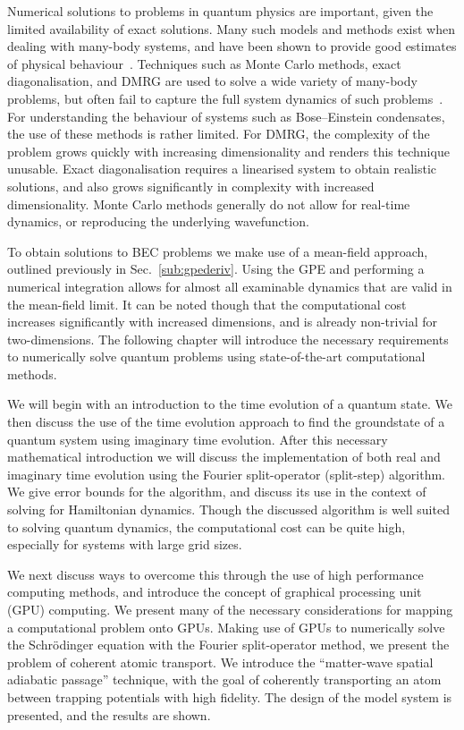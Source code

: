 Numerical solutions to problems in quantum physics are important, given the limited availability of exact solutions. Many such models and methods exist when dealing with many-body systems, and have been shown to provide good estimates of physical behaviour~\cite{BK:Krauth_2006}. Techniques such as Monte Carlo methods, exact diagonalisation, and DMRG are used to solve a wide variety of many-body problems, but often fail to capture the full system dynamics of such problems~\cite{NUM:Schollwock_rmp_2005}. For understanding the behaviour of systems such as Bose--Einstein condensates, the use of these methods is rather limited. For DMRG, the complexity of the problem grows quickly with increasing dimensionality and renders this technique unusable. Exact diagonalisation requires a linearised system to obtain realistic solutions, and also grows significantly in complexity with increased dimensionality. Monte Carlo methods generally do not allow for real-time dynamics, or reproducing the underlying wavefunction.

To obtain solutions to BEC problems we make use of a mean-field approach, outlined previously in Sec.~\ref{sub:gpederiv}. Using the GPE and performing a numerical integration allows for almost all examinable dynamics that are valid in the mean-field limit. It can be noted though that the computational cost increases significantly with increased dimensions, and is already non-trivial for two-dimensions. The following chapter will introduce the necessary requirements to numerically solve quantum problems using state-of-the-art computational methods.

We will begin with an introduction to the time evolution of a quantum state. We then discuss the use of the time evolution approach to find the groundstate of a quantum system using imaginary time evolution. After this necessary mathematical introduction we will discuss the implementation of both real and imaginary time evolution using the Fourier split-operator (split-step) algorithm. We give error bounds for the algorithm, and discuss its use in the context of solving for Hamiltonian dynamics. Though the discussed algorithm is well suited to solving quantum dynamics, the computational cost can be quite high, especially for systems with large grid sizes.

We next discuss ways to overcome this through the use of high performance computing methods, and introduce the concept of graphical processing unit (GPU) computing. We present many of the necessary considerations for mapping a computational problem onto GPUs. Making use of GPUs to numerically solve the Schr\"odinger equation with the Fourier split-operator method, we present the problem of coherent atomic transport. We introduce the ``matter-wave spatial adiabatic passage'' technique, with the goal of coherently transporting an atom between trapping potentials with high fidelity. The design of the model system is presented, and the results are shown.

